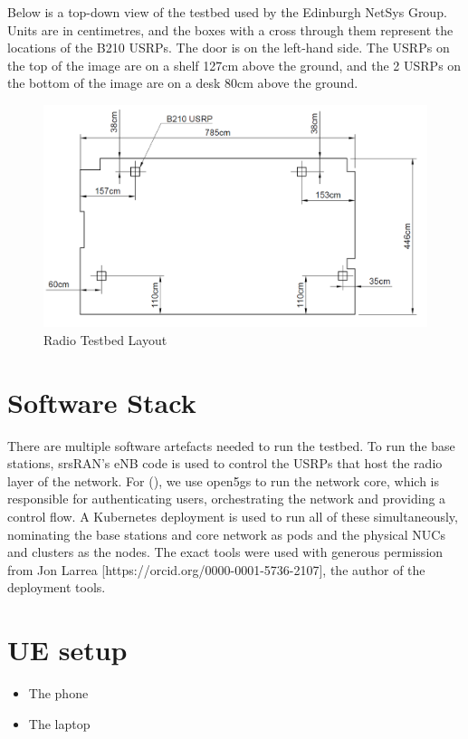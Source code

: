 Below is a top-down view of the testbed used by the Edinburgh NetSys Group. Units are in centimetres, and the boxes with a cross through them represent the locations of the B210 USRPs. The door is on the left-hand side. The USRPs on the top of the image are on a shelf 127cm above the ground, and the 2 USRPs on the bottom of the image are on a desk 80cm above the ground.

\begin{figure}[!h]
    \centering
    \includegraphics[width=1\linewidth]{src//img/room117tesbed.png}
    \caption{Radio Testbed Layout}
    \label{fig:appendix:testbed-drawing}
\end{figure}

\section{Software Stack}
There are multiple software artefacts needed to run the testbed. To run the base stations, srsRAN's eNB code is used to control the USRPs that host the radio layer of the network. For (), we use open5gs to run the network core, which is responsible for authenticating users, orchestrating the network and providing a control flow. A Kubernetes \insertref deployment is used to run all of these simultaneously, nominating the base stations and core network as pods and the physical NUCs and clusters as the nodes. The exact tools were used with generous permission from Jon Larrea [https://orcid.org/0000-0001-5736-2107], the author of the deployment tools.


\section{UE setup}
\begin{itemize}
    \item The phone
    \item The laptop
\end{itemize}
